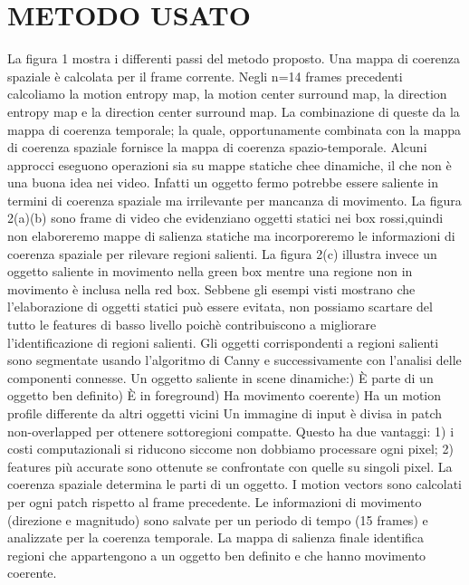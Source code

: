 \documentclass[12pt,twocolumn]{IEEEtran}
\begin{document}
	\section{METODO USATO}
		La figura 1 mostra i differenti passi del metodo proposto. Una mappa di coerenza spaziale è calcolata per il frame corrente. Negli n=14 frames precedenti calcoliamo la motion entropy map, la motion center surround map, la direction entropy map e la direction center surround map. La combinazione di queste da la mappa di coerenza temporale; la quale, opportunamente combinata con la mappa di coerenza spaziale fornisce la mappa di coerenza spazio-temporale.\newline
		Alcuni approcci eseguono operazioni sia su mappe statiche chee dinamiche, il che non è una buona idea nei video. Infatti un oggetto fermo potrebbe essere saliente in termini di coerenza spaziale ma irrilevante per mancanza di movimento. La figura 2(a)(b) sono frame di video che evidenziano oggetti statici nei box rossi,quindi non elaboreremo mappe di salienza statiche ma incorporeremo le informazioni di coerenza spaziale per rilevare regioni salienti. La figura 2(c) illustra invece un oggetto saliente in movimento nella green box mentre una regione non in movimento è inclusa nella red box. Sebbene gli esempi visti mostrano che l'elaborazione di oggetti statici può essere evitata, non possiamo scartare del tutto le features di basso livello poichè contribuiscono a migliorare l'identificazione di regioni salienti.\newline
		Gli oggetti corrispondenti a regioni salienti sono segmentate usando l'algoritmo di Canny e successivamente con l'analisi delle componenti connesse. Un oggetto saliente in scene dinamiche:) È parte di un oggetto ben definito) È in foreground) Ha movimento coerente) Ha un motion profile differente da altri oggetti vicini\newline
		Un immagine di input è divisa in patch non-overlapped per ottenere sottoregioni compatte. Questo ha due vantaggi: 1) i costi computazionali si riducono siccome non dobbiamo processare ogni pixel; 2) features più accurate sono ottenute se confrontate con quelle su singoli pixel.
		La coerenza spaziale determina le parti di un oggetto. I motion vectors sono calcolati per ogni patch rispetto al frame precedente. Le informazioni di movimento (direzione e magnitudo) sono salvate per un periodo di tempo (15 frames) e analizzate per la coerenza temporale. La mappa di salienza finale identifica regioni che appartengono a un oggetto ben definito e che hanno movimento coerente.
\end{document}
